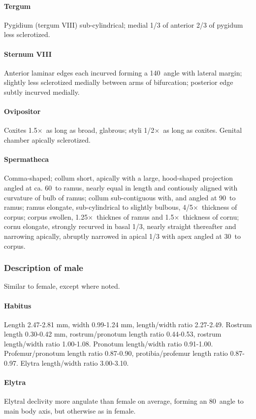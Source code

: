 \documentclass[fleqn,10pt,lineno]{wlpeerj} %
\newcommand{\td}{\textdegree~}
\newcommand{\x}{$\times$~}
\begin{document}
			\paragraph{Tergum}
				Pygidium (tergum VIII) sub-cylindrical; medial 1/3 of anterior 2/3 of pygidum less sclerotized.
			\paragraph{Sternum VIII}
				Anterior laminar edges each incurved forming a 140\td angle with lateral margin; slightly less sclerotized medially between arms of bifurcation; posterior edge subtly incurved medially.
			\paragraph{Ovipositor}
				Coxites 1.5\x as long as broad, glabrous; styli 1/2\x as long as coxites. Genital chamber apically sclerotized.
			\paragraph{Spermatheca}
				Comma-shaped; collum short, apically with a large, hood-shaped projection angled at ca. 60\td to ramus, nearly equal in length and contiously aligned with curvature of bulb of ramus; collum sub-contiguous with, and angled at 90\td to ramus; ramus elongate, sub-cylindrical to slightly bulbous, 4/5\x thickness of corpus; corpus swollen, 1.25\x thicknes of ramus and 1.5\x thickness of cornu; cornu elongate, strongly recurved in basal 1/3, nearly straight thereafter and narrowing apically, abruptly narrowed in apical 1/3 with apex angled at 30\td to corpus.
		\subsubsection*{Description of male}
			Similar to female, except where noted.
			\paragraph{Habitus}
				Length 2.47-2.81 mm, width 0.99-1.24 mm, length/width ratio 2.27-2.49. Rostrum length 0.30-0.42 mm, rostrum/pronotum length ratio 0.44-0.53, rostrum length/width ratio 1.00-1.08. Pronotum length/width ratio 0.91-1.00. Profemur/pronotum length ratio 0.87-0.90, protibia/profemur length ratio 0.87-0.97. Elytra length/width ratio 3.00-3.10.
			\paragraph{Elytra}
				Elytral declivity more angulate than female on average, forming an 80\td angle to main body axis, but otherwise as in female.
\end{document}
